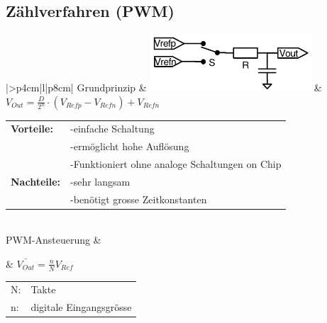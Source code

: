 \subsection{Zählverfahren (PWM)}
\begin{longtable}{|>{\bfseries}p{4cm}|l|p{8cm}|}
	\hline 
	Grundprinzip \hartl{466}
	& \includegraphics[width=6cm, valign=t]{./images/pwm_DAC.png}
	& $ V_{Out}=\frac{D}{2^n} \cdot (V_{Refp}-V_{Refn})+V_{Refn} $ \newline
	\begin{tabular}{lp{5cm}}
    \textbf{Vorteile:} 
      &-einfache Schaltung \\
      &-ermöglicht hohe Auflösung \\
      &-Funktioniert ohne analoge Schaltungen on Chip \\
    
    \textbf{Nachteile:}
      &-sehr langsam \\
      &-benötigt grosse Zeitkonstanten 
  \end{tabular}
	\\ \hline
	PWM-Ansteuerung 
	& \parbox[c][2cm]{6cm}{}
	& $\bar{V_{Out}}=\frac{n}{N}V_{Ref}$
	  \begin{tabular}{ll}
		N:&Takte\\
		n:&digitale Eingangsgrösse
	  \end{tabular}
	\\ \hline
\end{longtable}

